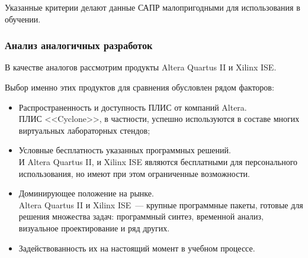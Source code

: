 Указанные критерии делают данные САПР малопригодными для использования в обучении.
%
%
\subsubsection{Анализ аналогичных разработок} \label{sec:characteristics:analogue}
В качестве аналогов рассмотрим продукты Altera Quartus II и Xilinx ISE.

Выбор именно этих продуктов для сравнения обусловлен рядом факторов:
\begin{itemize}
  \item Распространенность и доступность ПЛИС от компаний Altera.\\
  ПЛИС <<Cyclone>>, в частности, успешно используются в составе многих виртуальных лабораторных стендов;
  \item Условные бесплатность указанных программных решений.\\
  И Altera Quartus II, и Xilinx ISE являются бесплатными для персонального использования, но имеют при этом ограниченные возможности.
  \item Доминирующее положение на рынке.\\
  Altera Quartus II и Xilinx ISE~--- крупные программные пакеты, готовые для решения множества задач: программный синтез, временной анализ, визуальное проектирование и ряд других.
  \item Задействованность их на настоящий момент в учебном процессе.
\end{itemize}

